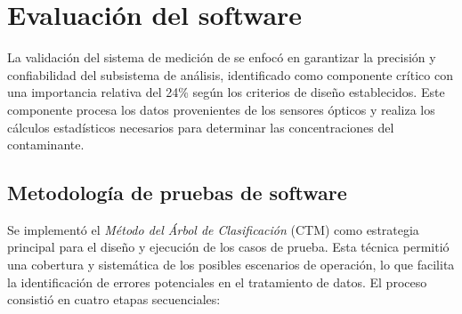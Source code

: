 




\section{Evaluación del software}


La validación del sistema de medición de \MPF se enfocó en garantizar la precisión y confiabilidad del subsistema de análisis, identificado como componente crítico con una importancia relativa del 24\% según los criterios de diseño establecidos. Este componente procesa los datos provenientes de los sensores ópticos y realiza los cálculos estadísticos necesarios para determinar las concentraciones del contaminante.

\subsection{Metodología de pruebas de software}

Se implementó el \textit{Método del Árbol de Clasificación} (CTM) como estrategia principal para el diseño y ejecución de los casos de prueba. Esta técnica permitió una cobertura  y sistemática de los posibles escenarios de operación, lo que facilita la identificación de errores potenciales en el tratamiento de datos. El proceso consistió en cuatro etapas secuenciales:

